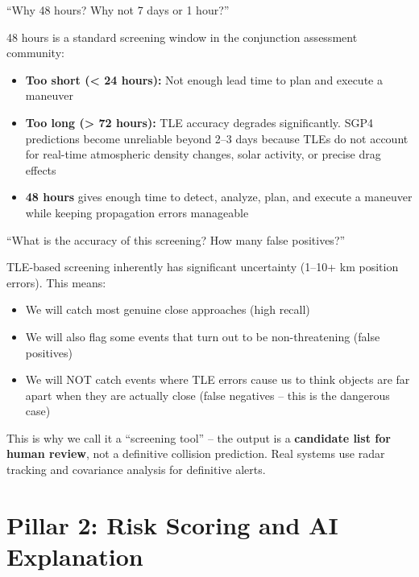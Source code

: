 \documentclass[12pt,a4paper]{article}
\begin{document}
\begin{questionbox}
``Why 48 hours? Why not 7 days or 1 hour?''
\end{questionbox}
\begin{answerbox}
48 hours is a standard screening window in the conjunction assessment community:
\begin{itemize}
    \item \textbf{Too short (< 24 hours):} Not enough lead time to plan and execute a maneuver
    \item \textbf{Too long (> 72 hours):} TLE accuracy degrades significantly. SGP4 predictions become unreliable beyond 2--3 days because TLEs do not account for real-time atmospheric density changes, solar activity, or precise drag effects
    \item \textbf{48 hours} gives enough time to detect, analyze, plan, and execute a maneuver while keeping propagation errors manageable
\end{itemize}
\end{answerbox}

\begin{questionbox}
``What is the accuracy of this screening? How many false positives?''
\end{questionbox}
\begin{answerbox}
TLE-based screening inherently has significant uncertainty (1--10+ km position errors). This means:
\begin{itemize}
    \item We will catch most genuine close approaches (high recall)
    \item We will also flag some events that turn out to be non-threatening (false positives)
    \item We will NOT catch events where TLE errors cause us to think objects are far apart when they are actually close (false negatives -- this is the dangerous case)
\end{itemize}
This is why we call it a ``screening tool'' -- the output is a \textbf{candidate list for human review}, not a definitive collision prediction. Real systems use radar tracking and covariance analysis for definitive alerts.
\end{answerbox}

\newpage
\section{Pillar 2: Risk Scoring and AI Explanation}
\end{document}

